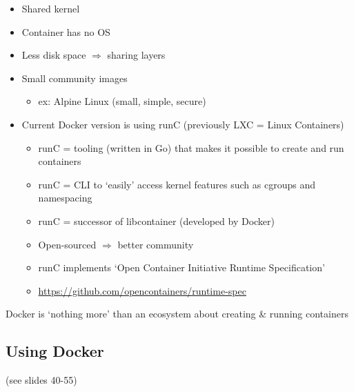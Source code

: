\documentclass{article}
\begin{document}
\begin{itemize}
    \item Shared kernel
    \item Container has no OS
    \item Less disk space $\Rightarrow$ sharing layers
    \item Small community images
    \begin{itemize}
        \item ex: Alpine Linux (small, simple, secure)
    \end{itemize}
    \item Current Docker version is using runC (previously LXC = Linux Containers)
    \begin{itemize}
        \item runC = tooling (written in Go) that makes it possible to create and run containers
        \item runC = CLI to `easily' access kernel features such as cgroups and namespacing
        \item runC = successor of libcontainer (developed by Docker)
        \item Open-sourced $\Rightarrow$ better community
        \item runC implements `Open Container Initiative Runtime Specification'
        \item \url{https://github.com/opencontainers/runtime-spec}
    \end{itemize}
\end{itemize}

Docker is `nothing more' than an ecosystem about creating \& running containers

\subsection{Using Docker}

(see slides 40-55)
\end{document}
